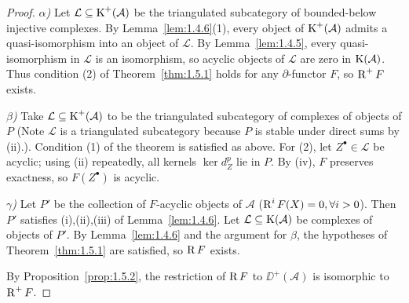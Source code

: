 \begin{proof}
\emph{$\alpha$)} Let $\mathcal{L}\subseteq\operatorname{K}^+(\mathcal{A})$ be the triangulated subcategory of bounded-below injective complexes. By Lemma~\ref{lem:1.4.6}(1), every object of $\operatorname{K}^+(\mathcal{A})$ admits a quasi-isomorphism into an object of $\mathcal{L}$. By Lemma~\ref{lem:1.4.5}, every quasi-isomorphism in $\mathcal{L}$ is an isomorphism, so acyclic objects of $\mathcal{L}$ are zero in $\operatorname{K}(\mathcal{A})$. Thus condition (2) of Theorem~\ref{thm:1.5.1} holds for any $\partial$-functor $F$, so $\operatorname{R}^+F$ exists.

\emph{$\beta$)} Take $\mathcal{L}\subseteq\operatorname{K}^+(\mathcal{A})$ to be the triangulated
subcategory of complexes of objects of $P$ (Note $\mathcal{L}$ is a
triangulated subcategory because $P$ is stable under direct sums
by (ii).). Condition (1) of the theorem is satisfied as above. For (2), let $Z^\bullet\in\mathcal{L}$ be acyclic; using (ii) repeatedly, all kernels $\ker d_Z^p$ lie in $P$. By (iv), $F$ preserves exactness, so $F(Z^\bullet)$ is acyclic.

\emph{$\gamma$)} Let $P'$ be the collection of $F$-acyclic objects of $\mathcal{A}$ ($\operatorname{R}^iF(X)=0,\forall i>0$). Then $P'$ satisfies (i),(ii),(iii) of Lemma~\ref{lem:1.4.6}. Let $\mathcal{L}\subseteq\operatorname{K}(\mathcal{A})$ be complexes of objects of $P'$. By Lemma~\ref{lem:1.4.6} and the argument for $\beta$, the hypotheses of Theorem~\ref{thm:1.5.1} are satisfied, so $\operatorname{R} F$ exists.

By Proposition~\ref{prop:1.5.2}, the restriction of $\operatorname{R} F$ to $\DD^+(\mathcal{A})$ is isomorphic to $\operatorname{R}^+F$.
\end{proof}

